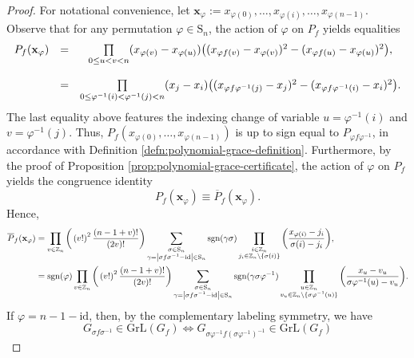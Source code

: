 \begin{proof}
For notational convenience, let $\mathbf{x}_{\varphi}:=x_{\varphi(0)},\ldots,x_{\varphi(i)},\ldots,x_{\varphi(n-1)}$. Observe that for any permutation $\varphi\in \text{S}_n$, the action of $\varphi$ on $P_f$ yields equalities
 \[
 \begin{array}{ccc}
P_{f}({\bf x}_{\varphi}) & = & \underset{0\le u<v<n}{\prod}(x_{\varphi(v)}-x_{\varphi(u)})\big((x_{\varphi f(v)}-x_{\varphi(v)})^{2}-(x_{\varphi f(u)}-x_{\varphi(u)})^{2}\big),\\
\\
 & = & \underset{0\le\varphi^{-1}(i)<\varphi^{-1}(j)<n}{\prod}(x_{j}-x_{i})\big((x_{\varphi f\varphi^{-1}(j)}-x_{j})^{2}-(x_{\varphi f\varphi^{-1}(i)}-x_{i})^{2}\big).
\end{array}
 \]
 The last equality above features the indexing change of variable $u=\varphi^{-1}(i)$ and $v=\varphi^{-1}(j)$. Thus, $P_{f}(x_{\varphi(0)},\ldots,x_{\varphi(n-1)})$ is up to sign equal to $P_{\varphi f\varphi^{-1}}$, in accordance with Definition \ref{defn:polynomial-grace-definition}. Furthermore, by the proof of Proposition \ref{prop:polynomial-grace-certificate}, the action of $\varphi$
on $P_{f}$ yields the congruence identity
\[
P_{f}(\mathbf{x}_{\varphi})\equiv \overline{P}_f(\mathbf{x}_{\varphi}).
\]
Hence,
\begin{align*}
    \overline{P}_f({\bf x}_{\varphi})	& =\prod_{v\in\mathbb{Z}_{n}}\bigg(\left(v!\right)^{2}\frac{\left(n-1+v\right)!}{\left(2v\right)!}\bigg)\sum_{\substack{\sigma\in\text{S}_{n}\\
\gamma=\left|\sigma f\sigma^{-1}-\text{id}\right|\in\text{S}_{n}
}
}\text{sgn}(\gamma\sigma)\prod_{\substack{i\in\mathbb{Z}_{n}\\
j_{i}\in\mathbb{Z}_{n}\backslash\{\sigma(i)\}
}
}\bigg(\frac{x_{\varphi(i)}-j_{i}}{\sigma(i)-j_{i}}\bigg),\\
	&=\text{sgn}(\varphi)\prod_{v\in\mathbb{Z}_{n}}\bigg(\left(v!\right)^{2}\frac{\left(n-1+v\right)!}{\left(2v\right)!}\bigg)\sum_{\substack{\sigma\in\text{S}_{n}\\
\gamma=\left|\sigma f\sigma^{-1}-\text{id}\right|\in\text{S}_{n}
}
}\text{sgn}(\gamma\sigma\varphi^{-1})\prod_{\substack{u\in\mathbb{Z}_{n}\\
v_{u}\in\mathbb{Z}_{n}\backslash\{\sigma\varphi^{-1}(u)\}
}
}\bigg(\frac{x_{u}-v_{u}}{\sigma\varphi^{-1}(u)-v_{u}}\bigg).
\end{align*}
If $\varphi=n-1-\text{id}$, then,
by the complementary labeling symmetry, we have 
\[
G_{\sigma f\sigma^{-1}}\in\text{GrL}\left(G_{f}\right)\Longleftrightarrow G_{\sigma\varphi^{-1}f(\sigma\varphi^{-1})^{-1}}\in\text{GrL}\left(G_{f}\right)
\]
\end{proof}
